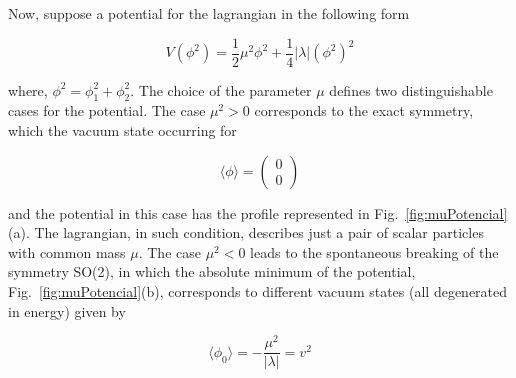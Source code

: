 Now, suppose a potential for the lagrangian in the following form

\begin{equation}
V(\phi^2) = \dfrac{1}{2}\mu^2 \phi^2 + \dfrac{1}{4} \vert \lambda \vert (\phi^2)^2
\end{equation}

where, $\phi^2 = \phi_1^2 + \phi_2^2$. The choice of the parameter $\mu$ defines two distinguishable cases for the potential. The case $\mu^2 > 0$ corresponds to the exact symmetry, which the vacuum state occurring for

\begin{equation}
\langle \phi \rangle = \left(\begin{aligned} 0 \\ 0 \end{aligned} \right)
\end{equation}

and the potential in this case has the profile represented in Fig.~\ref{fig:muPotencial}(a). The lagrangian, in such condition, describes just a pair of scalar particles with common mass $\mu$. The case $\mu^2 < 0$ leads to the spontaneous breaking of the symmetry SO(2), in which the absolute minimum of the potential, Fig.~\ref{fig:muPotencial}(b), corresponds to different vacuum states (all degenerated in energy) given by

\begin{equation}
\langle \phi_0 \rangle = - \dfrac{\mu^2}{\vert \lambda \vert} = v^2
\end{equation}


